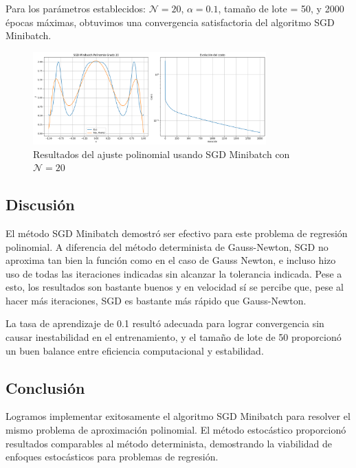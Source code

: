 \documentclass{article}
\begin{document}
Para los parámetros establecidos: $\mathcal{N} = 20$, $\alpha = 0.1$, tamaño de lote = 50, y 2000 épocas máximas, obtuvimos una convergencia satisfactoria del algoritmo SGD Minibatch.

\begin{figure}[H]
    \centering
    \includegraphics[width=0.8\textwidth]{images/3_sgd_minibatch.png}
    \caption{Resultados del ajuste polinomial usando SGD Minibatch con $\mathcal{N}=20$}
    \label{fig:sgd_results}
\end{figure}

\subsection{Discusión}

El método SGD Minibatch demostró ser efectivo para este problema de regresión polinomial. A diferencia del método determinista de Gauss-Newton, SGD no aproxima tan bien la función como en el caso de Gauss Newton, e incluso hizo uso de todas las iteraciones indicadas sin alcanzar la tolerancia indicada. Pese a esto, los resultados son bastante buenos y en velocidad sí se percibe que, pese al hacer más iteraciones, SGD es bastante más rápido que Gauss-Newton.

La tasa de aprendizaje de 0.1 resultó adecuada para lograr convergencia sin causar inestabilidad en el entrenamiento, y el tamaño de lote de 50 proporcionó un buen balance entre eficiencia computacional y estabilidad.

\subsection{Conclusión}

Logramos implementar exitosamente el algoritmo SGD Minibatch para resolver el mismo problema de aproximación polinomial. El método estocástico proporcionó resultados comparables al método determinista, demostrando la viabilidad de enfoques estocásticos para problemas de regresión.

\end{document}

